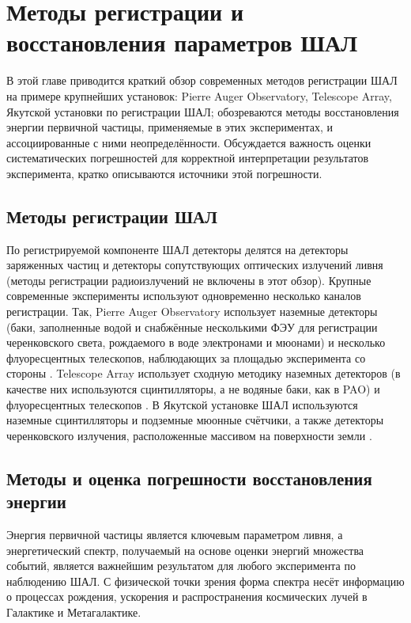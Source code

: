 \chapter{Методы регистрации и восстановления параметров ШАЛ}

\label{chapt:review}

В этой главе приводится краткий обзор современных методов регистрации ШАЛ на примере крупнейших установок: Pierre Auger Observatory, Telescope Array, Якутской установки по регистрации ШАЛ; обозреваются методы восстановления энергии первичной частицы, применяемые в этих экспериментах, и ассоциированные с ними неопределённости. Обсуждается важность оценки систематических погрешностей для корректной интерпретации результатов эксперимента, кратко описываются источники этой погрешности.


\section{Методы регистрации ШАЛ}

По регистрируемой компоненте ШАЛ детекторы делятся на детекторы заряженных частиц и детекторы сопутствующих оптических излучений ливня (методы регистрации радиоизлучений не включены в этот обзор). Крупные современные эксперименты используют одновременно несколько каналов регистрации. Так, Pierre Auger Observatory использует наземные детекторы (баки, заполненные водой и снабжённые несколькими ФЭУ для регистрации черенковского света, рождаемого в воде электронами и мюонами) и несколько флуоресцентных телескопов, наблюдающих за площадью эксперимента со стороны \cite{Abraham2010}. Telescope Array использует сходную методику наземных детекторов (в качестве них используются сцинтилляторы, а не водяные баки, как в PAO) и флуоресцентных телескопов \cite{AbuZayyad2013}. В Якутской установке ШАЛ используются наземные сцинтилляторы и подземные мюонные счётчики, а также детекторы черенковского излучения, расположенные массивом на поверхности земли \cite{Ivanov2007}.


\section{Методы и оценка погрешности восстановления энергии}

Энергия первичной частицы является ключевым параметром ливня, а энергетический спектр, получаемый на основе оценки энергий множества событий, является важнейшим результатом для любого эксперимента по наблюдению ШАЛ. С физической точки зрения форма спектра несёт информацию о процессах рождения, ускорения и распространения космических лучей в Галактике и Метагалактике.

